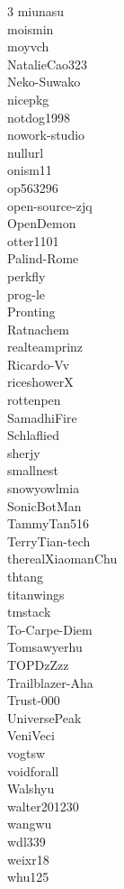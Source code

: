 \documentclass{llmxive}
\begin{document}
\begin{multicols}{3}
miunasu\\
moismin\\
moyvch\\
NatalieCao323\\
Neko-Suwako\\
nicepkg\\
notdog1998\\
nowork-studio\\
nullurl\\
onism11\\
op563296\\
open-source-zjq\\
OpenDemon\\
otter1101\\
Palind-Rome\\
perkfly\\
prog-le\\
Pronting\\
Ratnachem\\
realteamprinz\\
Ricardo-Vv\\
riceshowerX\\
rottenpen\\
SamadhiFire\\
Schlaflied\\
sherjy\\
smallnest\\
snowyowlmia\\
SonicBotMan\\
TammyTan516\\
TerryTian-tech\\
therealXiaomanChu\\
thtang\\
titanwings\\
tmstack\\
To-Carpe-Diem\\
Tomsawyerhu\\
TOPDzZzz\\
Trailblazer-Aha\\
Trust-000\\
UniversePeak\\
VeniVeci\\
vogtsw\\
voidforall\\
Walshyu\\
walter201230\\
wangwu\\
wdl339\\
weixr18\\
whu125\\

\end{multicols}
\end{document}
